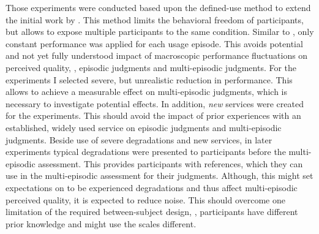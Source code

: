 Those experiments were conducted based upon the defined-use method to extend the initial work by \citet{moller_single-call_2011}.
This method limits the behavioral freedom of participants, but allows to expose multiple participants to the same condition.
Similar to \cite{moller_single-call_2011}, only constant performance was applied for each usage episode.
This avoids potential and not yet fully understood impact of macroscopic performance fluctuations on perceived quality, \ie, episodic judgments and multi-episodic judgments.
For the experiments I  selected severe, but unrealistic reduction in performance.
This allows to achieve a measurable effect on multi-episodic judgments, which is necessary to investigate potential effects.
In addition, \emph{new} services were created for the experiments.
This should avoid the impact of prior experiences with an established, widely used service on episodic judgments and multi-episodic judgments.
Beside use of severe degradations and new services, in later experiments typical degradations were presented to participants before the multi-episodic assessment.
This provides participants with references, which they can use in the multi-episodic assessment for their judgments.
Although, this might set expectations on to be experienced degradations and thus affect multi-episodic perceived quality, it is expected to reduce noise.
This should overcome one limitation of the required between-subject design, \ie, participants have different prior knowledge and might use the scales different.

